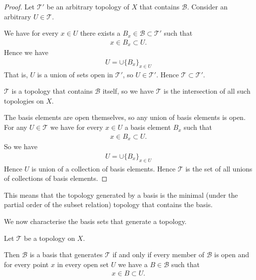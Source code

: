 \documentclass[]{article}
\begin{document}
\begin{proof}
	Let $ \mathcal{T}'$ be an arbitrary topology of $X$ that contains $\mathcal{B}$. Consider an arbitrary $U \in \mathcal{T}$. 

	We have for every $x \in U$ there exists a $B_x \in \mathcal{B} \subset \mathcal{T}'$ such that
	\begin{align*}
		x \in B_x \subset U.	
	\end{align*}
	Hence we have
	\begin{align*}
			U = \cup \{B_x\}_{x \in U}
	\end{align*}
	That is, $U$ is a union of sets open in $\mathcal{T}'$, so $U \in \mathcal{T}'$. Hence $\mathcal{T} \subset \mathcal{T}'$.

	$\mathcal{T}$  is a topology that contains $\mathcal{B}$ itself, so we have $\mathcal{T}$ is the intersection of all such topologies on $X$.
	
	The basis elements are open themselves, so any union of basis elements is open. For any $U \in \mathcal{T}$ we have for every $x \in U$ a basis element $B_x$ such that
	\begin{align*}
			x \in B_x \subset U.
	\end{align*}
	So we have
	\begin{align*}
			U = \cup \{B_x\}_{x \in U}
	\end{align*}
	Hence $U$ is union of a collection of basis elements. Hence $\mathcal{T}$ is the set of all unions of collections of basis elements.
\end{proof}

This means that the topology generated by a basis is the minimal (under the partial order of the subset relation) topology that contains the basis.

We now characterise the basis sets that generate a topology.

\begin{thm}
	Let $\mathcal{T}$ be a topology on $X$. 

	Then $\mathcal{B}$ is a basis that generates $\mathcal{T}$ if and only if every member of $\mathcal{B}$ is open and for every point $x$ in every open set $U$ we have a $B \in \mathcal{B}$ such that
	\begin{align*}
		x \in B \subset U.			
	\end{align*}
\end{thm}
\end{document}
